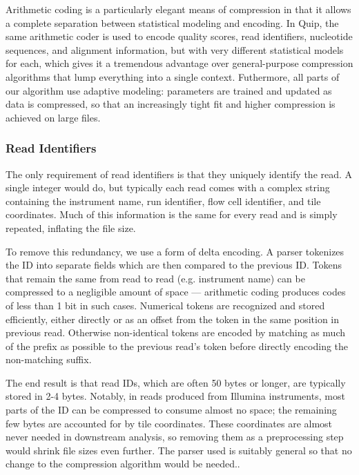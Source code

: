 \documentclass[a4,center,fleqn]{NAR}
\begin{document}
Arithmetic coding is a particularly elegant means of compression in that it
allows a complete separation between statistical modeling and encoding. In
Quip, the same arithmetic coder is used to encode quality scores, read
identifiers, nucleotide sequences, and alignment information, but with very
different statistical models for each, which gives it a tremendous advantage
over general-purpose compression algorithms that lump everything into a
single context. Futhermore, all parts of our algorithm use adaptive modeling:
parameters are trained and updated as data is compressed, so that an
increasingly tight fit and higher compression is achieved on large files.


\subsubsection{Read Identifiers}

The only requirement of read identifiers is that they uniquely identify the
read. A single integer would do, but typically each read comes with a complex
string containing the instrument name, run identifier, flow cell identifier,
and tile coordinates. Much of this information is the same for every read and
is simply repeated, inflating the file size.

To remove this redundancy, we use a form of delta encoding. A  parser
tokenizes the ID into separate fields which are then compared to the previous
ID. Tokens that remain the same from read to read (e.g. instrument name)
can be compressed to a negligible amount of space --- arithmetic coding produces
codes of less than 1 bit in such cases. Numerical tokens are recognized and
stored efficiently, either directly or as an offset from the token in the same
position in previous read. Otherwise non-identical tokens are encoded by
matching as much of the prefix as possible to the previous read's token before
directly encoding the non-matching suffix.

The end result is that read IDs, which are often 50 bytes or longer, are
typically stored in 2-4 bytes. Notably, in reads produced from Illumina
instruments, most parts of the ID can be compressed to consume almost no
space; the remaining few bytes are accounted for by tile coordinates. These
coordinates are almost never needed in downstream analysis, so removing them
as a preprocessing step would shrink file sizes even further. The parser used
is suitably general so that no change to the compression algorithm would be
needed..
\end{document}
